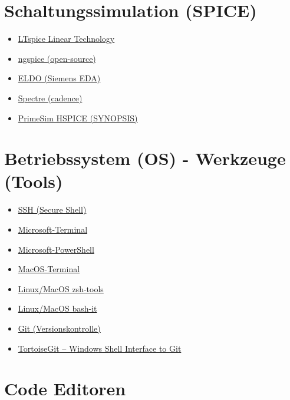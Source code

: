 \documentclass[
  ngerman,
  letterpaper,
]{scrbook}
\providecommand{\tightlist}{%
  \setlength{\itemsep}{0pt}\setlength{\parskip}{0pt}}
\begin{document}
\section{Schaltungssimulation (SPICE)}\label{schaltungssimulation-spice}

\begin{itemize}
\tightlist
\item
  \href{http://www.linear.com/designtools/software/}{LTspice Linear
  Technology}
\item
  \href{http://ngspice.sourceforge.net}{ngspice (open-source)}
\item
  \href{https://eda.sw.siemens.com/en-US/eldo/}{ELDO (Siemens EDA)}
\item
  \href{https://www.cadence.com/en_US/home/tools/custom-ic-analog-rf-design/circuit-simulation/spectre-simulation-platform.html}{Spectre
  (cadence)}
\item
  \href{https://www.synopsys.com/implementation-and-signoff/ams-simulation/primesim-hspice.html}{PrimeSim
  HSPICE (SYNOPSIS)}
\end{itemize}

\section{Betriebssystem (OS) - Werkzeuge
(Tools)}\label{betriebssystem-os---werkzeuge-tools}

\begin{itemize}
\tightlist
\item
  \href{https://de.wikipedia.org/wiki/Secure_Shell}{SSH (Secure Shell)}
\item
  \href{https://github.com/microsoft/terminal}{Microsoft-Terminal}
\item
  \href{https://learn.microsoft.com/de-de/powershell/scripting/learn/ps101/01-getting-started?view=powershell-7.4}{Microsoft-PowerShell}
\item
  \href{https://iterm2.com}{MacOS-Terminal}
\item
  \href{https://ohmyz.sh}{Linux/MacOS zsh-tools}
\item
  \href{https://bash-it.readthedocs.io/en/latest/}{Linux/MacOS bash-it}
\item
  \href{https://git-scm.com}{Git (Versionskontrolle)}
\item
  \href{https://tortoisegit.org/}{TortoiseGit -- Windows Shell Interface
  to Git}
\end{itemize}

\section{Code Editoren}\label{code-editoren}
\end{document}
